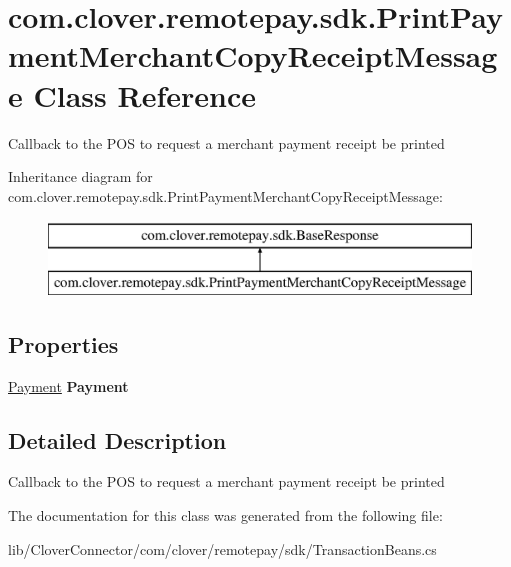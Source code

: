 \hypertarget{classcom_1_1clover_1_1remotepay_1_1sdk_1_1_print_payment_merchant_copy_receipt_message}{}\section{com.\+clover.\+remotepay.\+sdk.\+Print\+Payment\+Merchant\+Copy\+Receipt\+Message Class Reference}
\label{classcom_1_1clover_1_1remotepay_1_1sdk_1_1_print_payment_merchant_copy_receipt_message}


Callback to the P\+OS to request a merchant payment receipt be printed  


Inheritance diagram for com.\+clover.\+remotepay.\+sdk.\+Print\+Payment\+Merchant\+Copy\+Receipt\+Message\+:\begin{figure}[H]
\begin{center}
\leavevmode
\includegraphics[height=2.000000cm]{classcom_1_1clover_1_1remotepay_1_1sdk_1_1_print_payment_merchant_copy_receipt_message}
\end{center}
\end{figure}
\subsection*{Properties}
\begin{DoxyCompactItemize}
\item 
\mbox{\label{classcom_1_1clover_1_1remotepay_1_1sdk_1_1_print_payment_merchant_copy_receipt_message_a79d99fc5d0cbbd8da1e30eb9e6d34f3f}} 
\hyperlink{classcom_1_1clover_1_1sdk_1_1v3_1_1payments_1_1_payment}{Payment} {\bfseries Payment}
\end{DoxyCompactItemize}


\subsection{Detailed Description}
Callback to the P\+OS to request a merchant payment receipt be printed 



The documentation for this class was generated from the following file\+:\begin{DoxyCompactItemize}
\item 
lib/\+Clover\+Connector/com/clover/remotepay/sdk/Transaction\+Beans.\+cs\end{DoxyCompactItemize}
